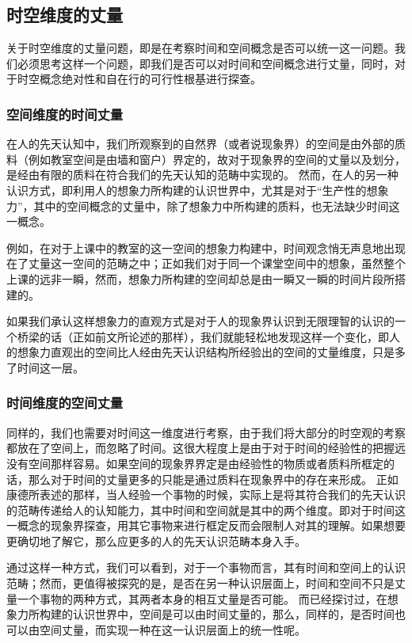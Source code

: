 \documentclass[lang=cn,11pt]{elegantpaper}
\begin{document}
\subsection{时空维度的丈量}
关于时空维度的丈量问题，即是在考察时间和空间概念是否可以统一这一问题。我们必须思考这样一个问题，即我们是否可以对时间和空间概念进行丈量，同时，对于时空概念绝对性和自在行的可行性根基进行探查。

\subsubsection{空间维度的时间丈量}
在人的先天认知中，我们所观察到的自然界（或者说现象界）的空间是由外部的质料（例如教室空间是由墙和窗户）界定的，故对于现象界的空间的丈量以及划分，是经由有限的质料在符合我们的先天认知的范畴中实现的。
然而，在人的另一种认识方式，即利用人的想象力所构建的认识世界中，尤其是对于“生产性的想象力”，其中的空间概念的丈量中，除了想象力中所构建的质料，也无法缺少时间这一概念。

例如，在对于上课中的教室的这一空间的想象力构建中，时间观念悄无声息地出现在了丈量这一空间的范畴之中；正如我们对于同一个课堂空间中的想象，虽然整个上课的远非一瞬，然而，想象力所构建的空间却总是由一瞬又一瞬的时间片段所搭建的。

如果我们承认这样想象力的直观方式是对于人的现象界认识到无限理智的认识的一个桥梁的话（正如前文所论述的那样），我们就能轻松地发现这样一个变化，即人的想象力直观出的空间比人经由先天认识结构所经验出的空间的丈量维度，只是多了时间这一层。
\subsubsection{时间维度的空间丈量}
同样的，我们也需要对时间这一维度进行考察，由于我们将大部分的时空观的考察都放在了空间上，而忽略了时间。这很大程度上是由于对于时间的经验性的把握远没有空间那样容易。如果空间的现象界界定是由经验性的物质或者质料所框定的话，那么对于时间的丈量更多的只能是通过质料在现象界中的存在来形成。
正如康德所表述的那样，当人经验一个事物的时候，实际上是将其符合我们的先天认识的范畴传递给人的认知能力，其中时间和空间就是其中的两个维度。即对于时间这一概念的现象界探查，用其它事物来进行框定反而会限制人对其的理解。如果想要更确切地了解它，那么应更多的人的先天认识范畴本身入手。

通过这样一种方式，我们可以看到，对于一个事物而言，其有时间和空间上的认识范畴；然而，更值得被探究的是，是否在另一种认识层面上，时间和空间不只是丈量一个事物的两种方式，其两者本身的相互丈量是否可能。
而已经探讨过，在想象力所构建的认识世界中，空间是可以由时间丈量的，那么，同样的，是否时间也可以由空间丈量，而实现一种在这一认识层面上的统一性呢。
\end{document}
